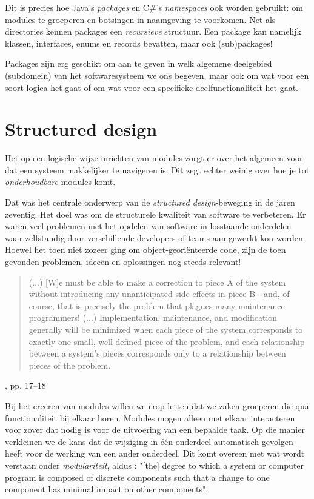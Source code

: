 Dit is precies hoe Java's \emph{packages} en C\#'s \emph{namespaces} ook worden gebruikt:
om modules te groeperen en botsingen in naamgeving te voorkomen.
Net als directories kennen packages een \emph{recursieve} structuur.
Een package kan namelijk klassen, interfaces, enums en records bevatten, 
maar ook (sub)packages!

Packages zijn erg geschikt om aan te geven in welk algemene deelgebied (subdomein) 
van het softwaresysteem we ons begeven, maar ook om wat voor een soort logica het gaat
of om wat voor een specifieke deelfunctionaliteit het gaat.

\section{Structured design}
Het op een logische wijze inrichten van modules 
zorgt er over het algemeen voor dat een systeem makkelijker 
te navigeren is.
Dit zegt echter weinig over hoe je tot \emph{onderhoudbare} modules komt.

Dat was het centrale onderwerp 
van de \emph{structured design}-beweging 
in de jaren zeventig. Het doel was om 
de structurele kwaliteit van software te verbeteren.
Er waren veel problemen met het opdelen 
van software in losstaande onderdelen waar zelfstandig
door verschillende developers of teams aan gewerkt kon worden.
Hoewel het toen niet zozeer ging om object-georiënteerde code,
zijn de toen gevonden problemen, ideeën en oplossingen nog steeds relevant!
\blockquote{
(...) [W]e must be able to make a correction to piece A of the
system without introducing any unanticipated side effects in piece B 
- and, of course, that is precisely the problem that plagues 
many maintenance programmers!
\newline\newline
(...)
\newline\newline
Implementation, maintenance, and modification 
generally will be minimized when each piece of the system
corresponds to exactly one small, well-defined piece of the problem, 
and each relationship between a system's pieces corresponds only 
to a relationship between pieces of the problem.
}{\cite{YourdonConstantine1979}, pp. 17--18}

Bij het creëren van modules willen we erop letten dat 
we zaken groeperen die qua functionaliteit bij elkaar horen.  
Modules mogen alleen met elkaar interacteren voor zover dat 
nodig is voor de uitvoering van een bepaalde taak.
Op die manier verkleinen we de kans dat de wijziging in één onderdeel
automatisch gevolgen heeft voor de werking van een ander onderdeel.
Dit komt overeen met wat wordt verstaan onder \emph{modulariteit}, 
aldus \cite{ISO25010}: 
"[the] degree to which a system or computer program is composed of 
discrete components such that a change to one component has minimal impact
on other components".


